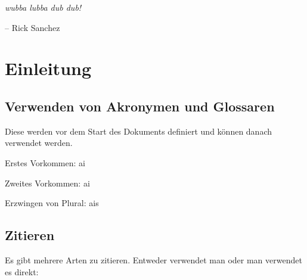 \epigraph{\itshape wubba lubba dub dub!}{-- Rick Sanchez}

\section{Einleitung}

\subsection{Verwenden von Akronymen und Glossaren}

Diese werden vor dem Start des Dokuments definiert und können danach verwendet werden. 

Erstes Vorkommen: \gls{ai}

Zweites Vorkommen: \gls{ai}

Erzwingen von Plural: \glspl{ai} 

\subsection{Zitieren}
Es gibt mehrere Arten zu zitieren. Entweder verwendet man \autocite{adams1995hitchhiker} oder man verwendet es direkt: \cite{adams1995hitchhiker}
\lipsum[1-30]

